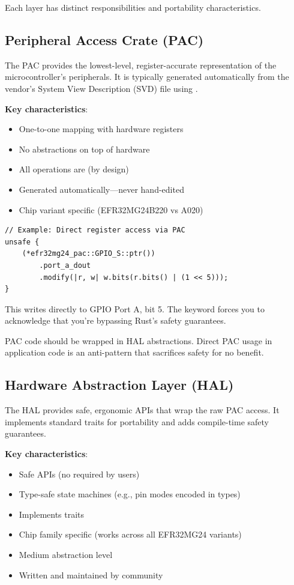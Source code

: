 Each layer has distinct responsibilities and portability characteristics.

\subsection{Peripheral Access Crate (PAC)}
\label{subsec:pac-layer}

The PAC provides the lowest-level, register-accurate representation of the microcontroller's peripherals. It is typically generated automatically from the vendor's System View Description (SVD) file using .

\textbf{Key characteristics}:
\begin{itemize}
    \item One-to-one mapping with hardware registers
    \item No abstractions on top of hardware
    \item All operations are  (by design)
    \item Generated automatically—never hand-edited
    \item Chip variant specific (EFR32MG24B220 vs A020)
\end{itemize}

\begin{verbatim}
// Example: Direct register access via PAC
unsafe {
    (*efr32mg24_pac::GPIO_S::ptr())
        .port_a_dout
        .modify(|r, w| w.bits(r.bits() | (1 << 5)));
}
\end{verbatim}

This writes directly to GPIO Port A, bit 5. The  keyword forces you to acknowledge that you're bypassing Rust's safety guarantees.

\begin{warningbox}
    PAC code should be wrapped in HAL abstractions. Direct PAC usage in application code is an anti-pattern that sacrifices safety for no benefit.
\end{warningbox}

\subsection{Hardware Abstraction Layer (HAL)}
\label{subsec:hal-layer}

The HAL provides safe, ergonomic APIs that wrap the raw PAC access. It implements standard traits for portability and adds compile-time safety guarantees.

\textbf{Key characteristics}:
\begin{itemize}
    \item Safe APIs (no  required by users)
    \item Type-safe state machines (e.g., pin modes encoded in types)
    \item Implements  traits
    \item Chip family specific (works across all EFR32MG24 variants)
    \item Medium abstraction level
    \item Written and maintained by community
\end{itemize}

